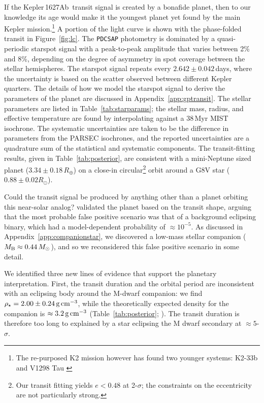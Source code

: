\documentclass[12pt,modern,twocolumn,tighten]{aastex63}
\newcommand{\pn}{Kepler\,1627Ab} %
\begin{document}

If the \pn\ transit signal is created by a bonafide planet,  then to
our knowledge its age would make it the youngest planet yet found by
the main Kepler mission.\footnote{The re-purposed K2
mission however has found two younger systems: K2-33b and V1298 Tau
\citep{David_et_al_2017,Mann_K2_33b_2016,david_four_2019}}  A portion
of the light curve is shown with the phase-folded transit in
Figure~\ref{fig:lc}.  The \texttt{PDCSAP}
photometry is dominated by a quasi-periodic starspot signal with a peak-to-peak
amplitude that varies between 2\% and 8\%, depending on the degree of
asymmetry in spot coverage between the stellar hemispheres.  The
starspot signal repeats every $2.642\pm0.042$\,days, where the
uncertainty is based on the scatter observed between different Kepler
quarters.  The details of how we model the starspot signal to derive
the parameters of the planet are discussed in
Appendix~\ref{app:gptransit}.  The stellar parameters are listed in
Table~\ref{tab:starparams}; the stellar mass, radius, and effective
temperature are found by interpolating against a 38$\,$Myr MIST
isochrone.  The systematic uncertainties are taken to be the
difference in parameters from the PARSEC isochrones, and the reported
uncertainties are a quadrature sum of the statistical and systematic
components.  The transit-fitting results, given in
Table~\ref{tab:posterior}, are consistent with a mini-Neptune sized
planet ($3.34\pm 0.18\,R_\oplus$) on a close-in circular\footnote{Our
transit fitting yields $e<0.48$ at 2-$\sigma$; the constraints on the
eccentricity are not particularly strong.} orbit around a G8V star
($0.88 \pm 0.02 R_\odot$).

Could the transit signal be produced by anything other than a planet
orbiting this near-solar analog?  \citet{morton_false_2016} validated
the planet based on the transit shape, arguing that the most probable 
false positive scenario was that of a background eclipsing binary,
which had a model-dependent probability of $\approx10^{-5}$.
As discussed in Appendix~\ref{app:companionstar},
we discovered a low-mass stellar companion ($M_{\rm B}\approx
0.44\,M_\odot$), and so we reconsidered this false positive scenario
in some detail. 


We identified three new lines of evidence that support the planetary
interpretation.  First, the transit duration and the orbital period
are inconsistent with an eclipsing body around the M-dwarf companion:
we find $\rho_\star = 2.00 \pm 0.24\,{\rm g\,cm}^{-3}$, while the
theoretically expected density for the companion is
$\approx 3.2\,{\rm g\,cm}^{-3}$ (Table~\ref{tab:posterior};
\citealt{choi_mesa_2016}).  The transit duration is therefore too long
to explained by a star eclipsing the M dwarf secondary at
$\approx$$5$-$\sigma$.
\end{document}
